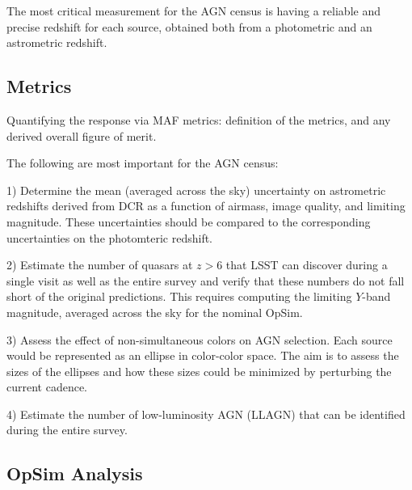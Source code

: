 The most critical measurement for the AGN census is having a reliable
and precise redshift for each source, obtained both from a photometric
and an astrometric redshift.




\subsection{Metrics}
\label{sec:\secname:metrics}

Quantifying the response via MAF metrics: definition of the metrics,
and any derived overall figure of merit.

The following are most important for the AGN census:

1) Determine the mean (averaged across the sky) uncertainty on astrometric
redshifts derived from DCR as a function of airmass, image quality, and
limiting magnitude. These uncertainties should be compared to the
corresponding uncertainties on the photomteric redshift.

2) Estimate the number of quasars at $z>6$ that LSST can discover
during a single visit as well as the entire survey and verify that
these numbers do not fall short of the original predictions. This
requires computing the limiting $Y$-band magnitude, averaged
across the sky for the nominal OpSim.

3) Assess the effect of non-simultaneous colors on AGN selection. Each
source would be represented as an ellipse in color-color space. The aim
is to assess the sizes of the ellipses and how these sizes could be
minimized by perturbing the current cadence.

4) Estimate the number of low-luminosity AGN (LLAGN) that can be
identified during the entire survey.


\subsection{OpSim Analysis}
\label{sec:\secname:analysis}

